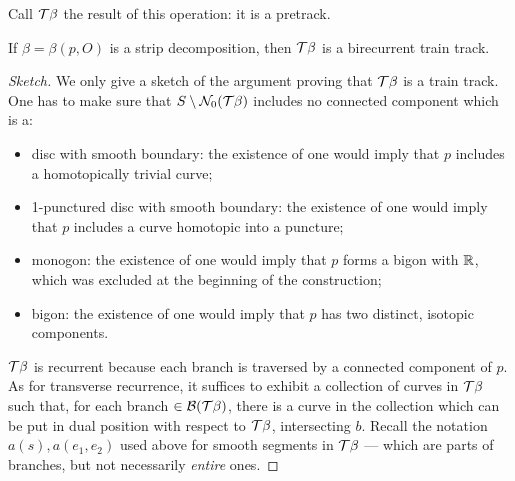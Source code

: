 Call ${\mathcal T}\beta$ the result of this operation: it is a pretrack. 

\begin{lemma}\label{lem:birecurrent}
If $\beta=\beta(p,O)$ is a strip decomposition, then ${\mathcal T}\beta$ is a birecurrent train track.
\end{lemma}
\begin{proof}[Sketch]
We only give a sketch of the argument proving that ${\mathcal T}\beta$ is a train track. One has to make sure that $S\setminus {\mathcal N}_0({\mathcal T}\beta)$ includes no connected component which is a:
\begin{itemize}
\item disc with smooth boundary: the existence of one would imply that $p$ includes a homotopically trivial curve;
\item 1-punctured disc with smooth boundary: the existence of one would imply that $p$ includes a curve homotopic into a puncture;
\item monogon: the existence of one would imply that $p$ forms a bigon with $\mathbb R$, which was excluded at the beginning of the construction;
\item bigon: the existence of one would imply that $p$ has two distinct, isotopic components.
\end{itemize}

${\mathcal T}\beta$ is recurrent because each branch is traversed by a connected component of $p$. As for transverse recurrence, it suffices to exhibit a collection of curves in ${\mathcal T}\beta$ such that, for each branch $\in\mathcal B({\mathcal T}\beta)$, there is a curve in the collection which can be put in dual position with respect to ${\mathcal T}\beta$, intersecting $b$. Recall the notation $a(s), a(e_1,e_2)$ used above for smooth segments in ${\mathcal T}\beta$ --- which are parts of branches, but not necessarily \emph{entire} ones.


\end{proof}

